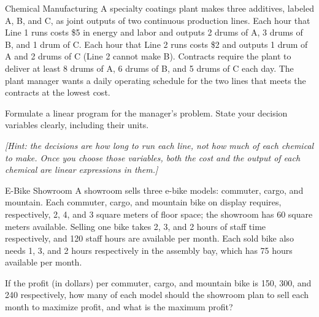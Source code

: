 \begin{ex}{Chemical Manufacturing}{}
\label{ex:ChemicalPlant}
 A specialty coatings plant makes three additives, labeled A, B, and C, as joint outputs of two continuous production lines.  Each hour that Line 1 runs costs \$5 in energy and labor and outputs 2 drums of A, 3 drums of B, and 1 drum of C.  Each hour that Line 2 runs costs \$2 and outputs 1 drum of A and 2 drums of C (Line 2 cannot make B).  Contracts require the plant to deliver at least 8 drums of A, 6 drums of B, and 5 drums of C each day.  The plant manager wants a daily operating schedule for the two lines that meets the contracts at the lowest cost.

Formulate a linear program for the manager's problem.  State your decision variables clearly, including their units.

\emph{[Hint: the decisions are how long to run each line, not how much of each chemical to make.  Once you choose those variables, both the cost and the output of each chemical are linear expressions in them.]}
\label{exer:ChemicalPlant}
\end{ex}

\begin{ex}{E-Bike Showroom}{}
\label{ex:ebike-showroom}
 A showroom sells three e-bike models: commuter, cargo, and mountain. Each commuter, cargo, and mountain bike on display requires, respectively, 2, 4, and 3 square meters of floor space; the showroom has 60 square meters available. Selling one bike takes 2, 3, and 2 hours of staff time respectively, and 120 staff hours are available per month. Each sold bike also needs 1, 3, and 2 hours respectively in the assembly bay, which has 75 hours available per month.

If the profit (in dollars) per commuter, cargo, and mountain bike is 150, 300, and 240 respectively, how many of each model should the showroom plan to sell each month to maximize profit, and what is the maximum profit?
\end{ex}

